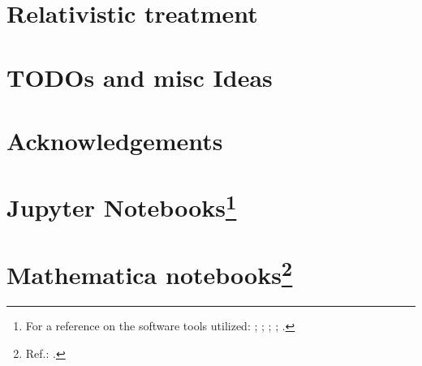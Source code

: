 \chapter{Relativistic treatment}


\iftodo
  \chapter{TODOs and misc Ideas}
  
\fi

\iftodo
  \chapter*{Acknowledgements}

  
\fi

\appendix

\chapter[Jupyter Notebooks]{Jupyter Notebooks\footnote{
  For a reference on the software tools utilized:
  \cite{comp:scipy};
  \cite{comp:sympy};
  \cite{comp:jupyter};
  \cite{comp:matplotlib};
  \cite{comp:numpy}.
}}



%


\chapter[Mathematica notebooks]{Mathematica notebooks\footnote{
  Ref.: \cite{Wolfram}.
}}



\printbibliography[heading=bibintoc]


